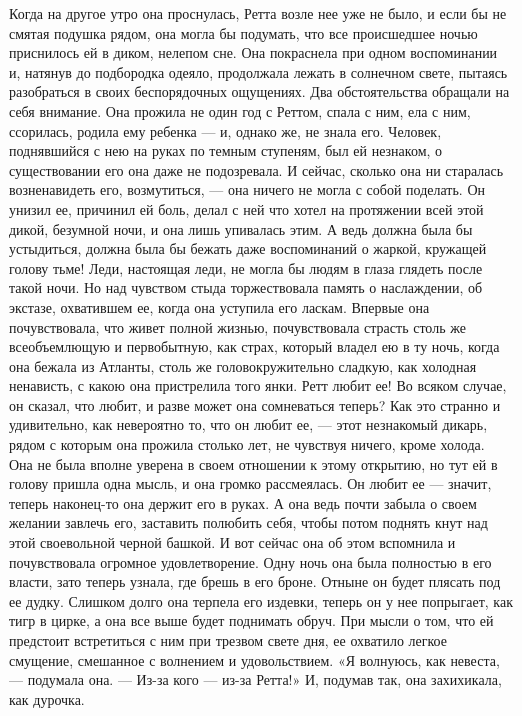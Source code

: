 Когда на другое утро она проснулась, Ретта возле нее уже не было, и если бы не смятая подушка рядом, она могла бы подумать, что все происшедшее ночью приснилось ей в диком, нелепом сне. Она покраснела при одном воспоминании и, натянув до подбородка одеяло, продолжала лежать в солнечном свете, пытаясь разобраться в своих беспорядочных ощущениях.
Два обстоятельства обращали на себя внимание. Она прожила не один год с Реттом, спала с ним, ела с ним, ссорилась, родила ему ребенка — и, однако же, не знала его. Человек, поднявшийся с нею на руках по темным ступеням, был ей незнаком, о существовании его она даже не подозревала. И сейчас, сколько она ни старалась возненавидеть его, возмутиться, — она ничего не могла с собой поделать. Он унизил ее, причинил ей боль, делал с ней что хотел на протяжении всей этой дикой, безумной ночи, и она лишь упивалась этим.
А ведь должна была бы устыдиться, должна была бы бежать даже воспоминаний о жаркой, кружащей голову тьме! Леди, настоящая леди, не могла бы людям в глаза глядеть после такой ночи. Но над чувством стыда торжествовала память о наслаждении, об экстазе, охватившем ее, когда она уступила его ласкам. Впервые она почувствовала, что живет полной жизнью, почувствовала страсть столь же всеобъемлющую и первобытную, как страх, который владел ею в ту ночь, когда она бежала из Атланты, столь же головокружительно сладкую, как холодная ненависть, с какою она пристрелила того янки.
Ретт любит ее! Во всяком случае, он сказал, что любит, и разве может она сомневаться теперь? Как это странно и удивительно, как невероятно то, что он любит ее, — этот незнакомый дикарь, рядом с которым она прожила столько лет, не чувствуя ничего, кроме холода. Она не была вполне уверена в своем отношении к этому открытию, но тут ей в голову пришла одна мысль, и она громко рассмеялась. Он любит ее — значит, теперь наконец-то она держит его в руках. А она ведь почти забыла о своем желании завлечь его, заставить полюбить себя, чтобы потом поднять кнут над этой своевольной черной башкой. И вот сейчас она об этом вспомнила и почувствовала огромное удовлетворение. Одну ночь она была полностью в его власти, зато теперь узнала, где брешь в его броне. Отныне он будет плясать под ее дудку. Слишком долго она терпела его издевки, теперь он у нее попрыгает, как тигр в цирке, а она все выше будет поднимать обруч.
При мысли о том, что ей предстоит встретиться с ним при трезвом свете дня, ее охватило легкое смущение, смешанное с волнением и удовольствием.
«Я волнуюсь, как невеста, — подумала она. — Из-за кого — из-за Ретта!» И, подумав так, она захихикала, как дурочка.
